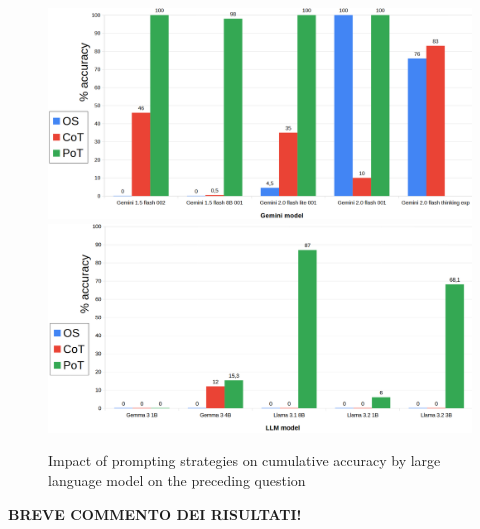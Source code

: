 \documentclass[12pt]{article}
\begin{document}
\begin{figure}[H]
    \centering
            \includegraphics[width=1\textwidth]{q102Gemini.png}
            \includegraphics[width=1\textwidth]{q102Other.png}
    \caption[Accuracy on Question 4 by LLM]{Impact of prompting strategies on cumulative accuracy by large language model on the preceding question}
    \end{figure} 
\textbf{BREVE COMMENTO DEI RISULTATI!}

\vspace{1cm}

\end{document}
